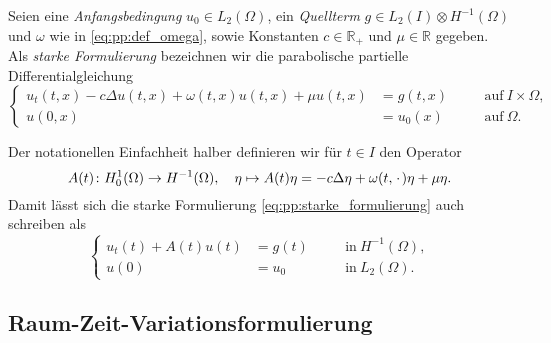 \begin{Definition}
\label{definition:pp:starke_formulierung}
    Seien eine \emph{Anfangsbedingung} $u_{0} \in L_{2}(\Omega)$, ein \emph{Quellterm} $g \in L_{2}(I) \otimes H^{-1}(\Omega)$ und $\omega$ wie in \eqref{eq:pp:def_omega}, sowie Konstanten $c \in \mathbb{R}_{+}$ und $\mu \in \mathbb{R}$ gegeben.
    Als \emph{starke Formulierung} bezeichnen wir die parabolische partielle Differentialgleichung
    \begin{equation}
    \label{eq:pp:starke_formulierung}
        \left\{
        \begin{aligned}
            u_{t}(t, x) - c \Delta u(t, x) + \omega(t, x) u(t, x) + \mu u(t, x) &= g(t, x) \quad &&\text{auf}~I \times \Omega,\\
            u(0, x) &= u_{0}(x) \quad &&\text{auf}~\Omega.
        \end{aligned}
        \right.
    \end{equation}
\end{Definition}

\begin{Bemerkung}
\label{bemerkung:pp:definition_operator_A}
    Der notationellen Einfachheit halber definieren wir für $t \in I$ den Operator
    \begin{equation}
    \label{eq:pp:definition_operator_A}
        A(t) \colon H^{1}_{0}(\Omega) \to H^{-1}(\Omega), \quad \eta \mapsto A(t) \eta = - c \Delta \eta + \omega(t, {\mkern2mu\cdot\mkern2mu}) \eta + \mu \eta.
    \end{equation}
    Damit lässt sich die starke Formulierung \eqref{eq:pp:starke_formulierung} auch schreiben als
    \begin{equation}
        \left\{
        \begin{aligned}
            u_t(t) + A(t)u(t) &= g(t) \quad &&\text{in}~H^{-1}(\Omega),\\
            u(0) &= u_{0} \quad &&\text{in}~L_{2}(\Omega).
        \end{aligned}
        \right.
    \end{equation}
\end{Bemerkung}

\subsection{Raum-Zeit-Variationsformulierung} %
\label{sub:variationsformulierungen}


